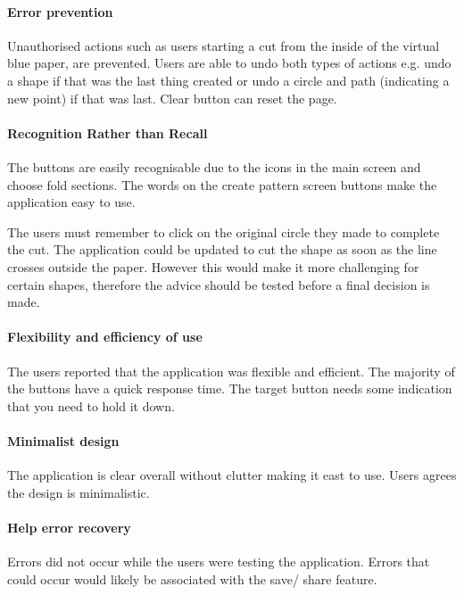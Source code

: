 \documentclass[11pt]{article}
\begin{document}
                \paragraph{Error prevention}
                Unauthorised actions such as users starting a cut from the inside of the virtual blue paper, are prevented. Users are able to undo both types of actions e.g. undo a shape if that was the last thing created or undo a circle and path (indicating a new point) if that was last. Clear button can reset the page. 

                \paragraph{Recognition Rather than Recall}
                The buttons are easily recognisable due to the icons in the main screen and choose fold sections. The words on the create pattern screen buttons make the application easy to use. 
                
                The users must remember to click on the original circle they made to complete the cut. The application could be updated to cut the shape as soon as the line crosses outside the paper. However this would make it more challenging for certain shapes, therefore the advice should be tested before a final decision is made.


                \paragraph{Flexibility and efficiency of use} 
                The users reported that the application was flexible and efficient. The majority of the buttons have a quick response time. The target button needs some indication that you need to hold it down.

                \paragraph{Minimalist design}
                The application is clear overall without clutter making it east to use. Users agrees the design is minimalistic. 

                \paragraph{Help error recovery}
                Errors did not occur while the users were testing the application. Errors that could occur would likely be associated with the save/ share feature.
\end{document}
